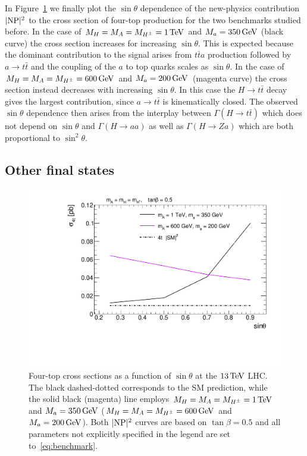 \documentclass[a4paper, 11pt,notoc]{article}
\newcommand{\mA}{\ensuremath{M_{A}}\xspace}
\newcommand{\ma}{\ensuremath{M_{a}}\xspace}
\newcommand{\mH}{\ensuremath{M_{H}}\xspace}
\newcommand{\mHc}{\ensuremath{M_{H^{\pm}}}\xspace}
\begin{document}
In Figure~\ref{DMHF-4top-scan3} we finally plot the  $\sin \theta$ dependence of the new-physics contribution~$|{\rm NP}|^2$ to the cross section of four-top production for the two benchmarks studied before. 
In the case of $\mH =\mA=\mHc = 1 \, {\rm TeV}$ and $\ma = 350 \, {\rm GeV}$ (black curve) the cross section  increases for increasing $\sin \theta$. This is expected because the dominant contribution to the signal arises from $t \bar t  a$ production followed by $a \to t \bar t$ and the coupling of the $a$ to top quarks scales as $\sin \theta$. In the case of $\mH =\mA=\mHc = 600 \, {\rm GeV}$ and $\ma = 200 \, {\rm GeV}$~(magenta curve) the cross section instead decreases with increasing $\sin \theta$.  In this case  the $H \to t \bar t$ decay gives the largest  contribution, since $a \to t \bar t$ is kinematically closed. The observed $\sin \theta$ dependence then arises from the interplay between $\Gamma (H \to t \bar t)$ which does not depend on $\sin \theta$ and $\Gamma (H \to aa)$ as well as $\Gamma (H \to Za)$ which are both proportional to $\sin^2 \theta$.
 
\subsection{Other final states}
\label{sec:others}

\begin{figure}[t!]
\centering
\includegraphics[width=.625\textwidth]{plot_st.pdf}
\vspace{1mm}
\caption{\label{DMHF-4top-scan3} Four-top cross sections as a function of $\sin \theta$ at the $13 \, {\rm TeV}$ LHC. The black dashed-dotted corresponds to the SM prediction, while the solid black (magenta) line employs  $\mH =\mA=\mHc = 1 \, {\rm TeV}$ and $\ma = 350  \, {\rm GeV}$ ($\mH =\mA=\mHc = 600 \, {\rm GeV}$ and $\ma = 200 \, {\rm GeV}$). Both $|{\rm NP}|^2$ curves are based on $\tan \beta = 0.5$ and all parameters not explicitly specified in the legend are set to~\eqref{eq:benchmark}. }
\end{figure}
\end{document}
